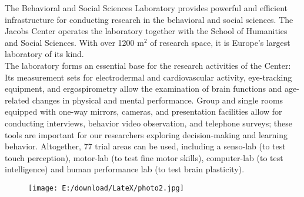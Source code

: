 The Behavioral and Social Sciences Laboratory provides powerful and efficient infrastructure for conducting research in the behavioral and social sciences. The Jacobs Center operates the laboratory together with the School of Humanities and Social Sciences. With over 1200 m$^{2}$ of research space, it is Europe's largest laboratory of its kind. 
\\
The laboratory forms an essential base for the research activities of the Center:
Its measurement sets for electrodermal and cardiovascular activity, eye-tracking equipment, and ergospirometry allow the examination of brain functions and age-related changes in physical and mental performance. Group and single rooms equipped with one-way mirrors, cameras, and presentation facilities allow for conducting interviews, behavior video observation, and telephone surveys; these tools are important for our researchers exploring decision-making and learning behavior. Altogether, 77 trial areas can be used, including a senso-lab (to test touch perception), motor-lab (to test fine motor skills), computer-lab (to test intelligence) and human performance lab (to test brain plasticity). 

\begin{figure}[htbp]
	\begin{center}
		\texttt{[image: E:/download/LateX/photo2.jpg]}
	\end{center}
\end{figure}

